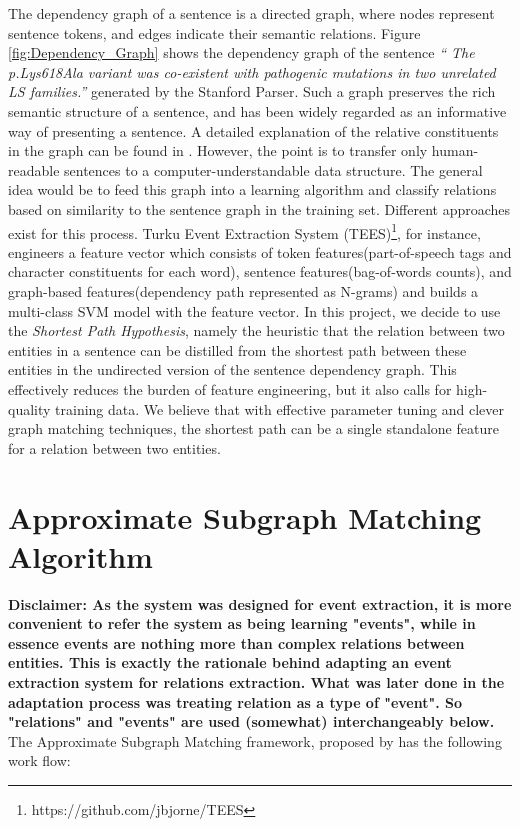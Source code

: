 The dependency graph of a sentence is a directed graph, where nodes represent sentence tokens, and edges indicate their semantic relations. Figure \ref{fig:Dependency_Graph} shows the dependency graph of the sentence \emph{`` The p.Lys618Ala variant was co-existent with pathogenic mutations in two unrelated LS families.''} generated by the Stanford Parser. Such a graph preserves the rich semantic structure of a sentence, and has been widely regarded as an informative way of presenting a sentence. A detailed explanation of the relative constituents in the graph can be found in \cite{de2008stanford}. However, the point is to transfer only human-readable sentences to a computer-understandable data structure. The general idea would be to feed this graph into a learning algorithm and classify relations based on similarity to the sentence graph in the training set. Different approaches exist for this process. Turku Event Extraction System (TEES)\footnote{https://github.com/jbjorne/TEES}, for instance, engineers a feature vector which consists of token features(part-of-speech tags and character constituents for each word), sentence features(bag-of-words counts), and graph-based features(dependency path represented as N-grams) and builds a multi-class SVM model with the feature vector\cite{bjorne2011generalizing}. In this project, we decide to use the \emph{Shortest Path Hypothesis}\cite{bunescu2005shortest}, namely the heuristic that the relation between two entities in a sentence can be distilled from the shortest path between these entities in the undirected version of the sentence dependency graph. This effectively reduces the burden of feature engineering\cite{liu2013approximate}, but it also calls for high-quality training data. We believe that with effective parameter tuning and clever graph matching techniques, the shortest path can be a single standalone feature for a relation between two entities.
\section{Approximate Subgraph Matching Algorithm}
\textbf{Disclaimer: As the system was designed for event extraction, it is more convenient to refer the system as being learning "events", while in essence events are nothing more than complex relations between entities. This is exactly the rationale behind adapting an event extraction system for relations extraction. What was later done in the adaptation process was treating relation as a type of "event". So "relations" and "events" are used (somewhat) interchangeably below. }\newline
The Approximate Subgraph Matching framework, proposed by \citet{liu2013approximate} has the following work flow:
